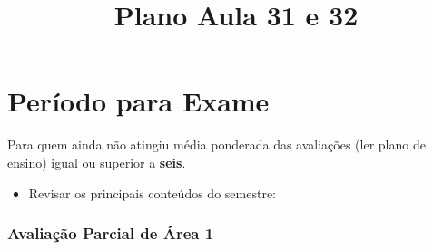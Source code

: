 \documentclass[
]{article}
\title{Plano Aula 31 e 32}
\author{}
\date{}
\providecommand{\tightlist}{%
  \setlength{\itemsep}{0pt}\setlength{\parskip}{0pt}}
\begin{document}
\maketitle

\addtolength{\headheight}{1.0cm}
\pagestyle{fancyplain} 
\renewcommand{\headrulewidth}{0pt}

\hypertarget{peruxedodo-para-exame}{%
\section{Período para Exame}\label{peruxedodo-para-exame}}

Para quem ainda não atingiu média ponderada das avaliações (ler plano de
ensino) igual ou superior a \textbf{seis}.

\begin{itemize}
\tightlist
\item
  Revisar os principais conteúdos do semestre:
\end{itemize}

\hypertarget{avaliauxe7uxe3o-parcial-de-uxe1rea-1}{%
\subsubsection{Avaliação Parcial de Área
1}\label{avaliauxe7uxe3o-parcial-de-uxe1rea-1}}
\end{document}
